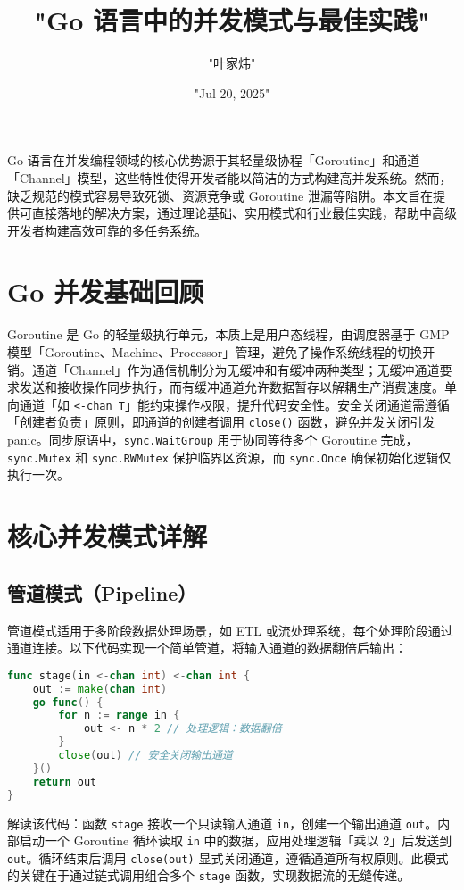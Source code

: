 \title{"Go 语言中的并发模式与最佳实践"}
\author{"叶家炜"}
\date{"Jul 20, 2025"}
\maketitle
Go 语言在并发编程领域的核心优势源于其轻量级协程「Goroutine」和通道「Channel」模型，这些特性使得开发者能以简洁的方式构建高并发系统。然而，缺乏规范的模式容易导致死锁、资源竞争或 Goroutine 泄漏等陷阱。本文旨在提供可直接落地的解决方案，通过理论基础、实用模式和行业最佳实践，帮助中高级开发者构建高效可靠的多任务系统。\par
\chapter{Go 并发基础回顾}
Goroutine 是 Go 的轻量级执行单元，本质上是用户态线程，由调度器基于 GMP 模型「Goroutine、Machine、Processor」管理，避免了操作系统线程的切换开销。通道「Channel」作为通信机制分为无缓冲和有缓冲两种类型；无缓冲通道要求发送和接收操作同步执行，而有缓冲通道允许数据暂存以解耦生产消费速度。单向通道「如 \texttt{<-chan T}」能约束操作权限，提升代码安全性。安全关闭通道需遵循「创建者负责」原则，即通道的创建者调用 \texttt{close()} 函数，避免并发关闭引发 panic。同步原语中，\texttt{sync.WaitGroup} 用于协同等待多个 Goroutine 完成，\texttt{sync.Mutex} 和 \texttt{sync.RWMutex} 保护临界区资源，而 \texttt{sync.Once} 确保初始化逻辑仅执行一次。\par
\chapter{核心并发模式详解}
\section{管道模式（Pipeline）}
管道模式适用于多阶段数据处理场景，如 ETL 或流处理系统，每个处理阶段通过通道连接。以下代码实现一个简单管道，将输入通道的数据翻倍后输出：\par
\begin{lstlisting}[language=go]
func stage(in <-chan int) <-chan int {
    out := make(chan int)
    go func() {
        for n := range in {
            out <- n * 2 // 处理逻辑：数据翻倍
        }
        close(out) // 安全关闭输出通道
    }()
    return out
}
\end{lstlisting}
解读该代码：函数 \texttt{stage} 接收一个只读输入通道 \texttt{in}，创建一个输出通道 \texttt{out}。内部启动一个 Goroutine 循环读取 \texttt{in} 中的数据，应用处理逻辑「乘以 2」后发送到 \texttt{out}。循环结束后调用 \texttt{close(out)} 显式关闭通道，遵循通道所有权原则。此模式的关键在于通过链式调用组合多个 \texttt{stage} 函数，实现数据流的无缝传递。\par

